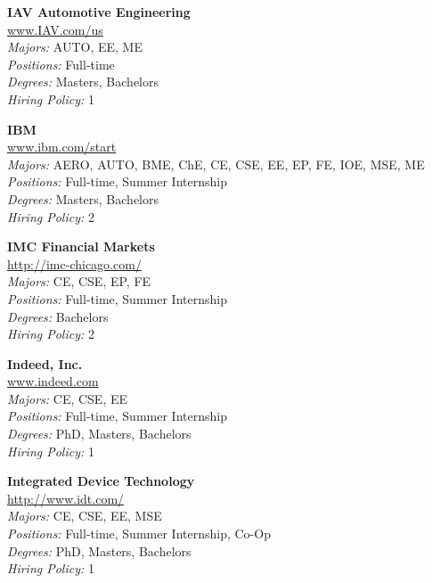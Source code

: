 \documentclass{article}
\begin{document}
\begin{center}
\begin{multicols}{3}
\begin{minipage}{.9\columnwidth}{\Large\bf IAV Automotive Engineering }\\
	\url{www.IAV.com/us}\\
	\emph{Majors:} AUTO, EE, ME\\
	\emph{Positions:} Full-time\\
	\emph{Degrees:} Masters, Bachelors\\
	\emph{Hiring Policy:} 1\\
\end{minipage}
 
\begin{minipage}{.9\columnwidth}{\Large\bf IBM }\\
	\url{www.ibm.com/start}\\
	\emph{Majors:} AERO, AUTO, BME, ChE, CE, CSE, EE, EP, FE, IOE, MSE, ME\\
	\emph{Positions:} Full-time, Summer Internship\\
	\emph{Degrees:} Masters, Bachelors\\
	\emph{Hiring Policy:} 2\\
\end{minipage}
 
\begin{minipage}{.9\columnwidth}{\Large\bf IMC Financial Markets }\\
	\url{http://imc-chicago.com/}\\
	\emph{Majors:} CE, CSE, EP, FE\\
	\emph{Positions:} Full-time, Summer Internship\\
	\emph{Degrees:} Bachelors\\
	\emph{Hiring Policy:} 2\\
\end{minipage}
 
\begin{minipage}{.9\columnwidth}{\Large\bf Indeed, Inc. }\\
	\url{www.indeed.com}\\
	\emph{Majors:} CE, CSE, EE\\
	\emph{Positions:} Full-time, Summer Internship\\
	\emph{Degrees:} PhD, Masters, Bachelors\\
	\emph{Hiring Policy:} 1\\
\end{minipage}
 
\begin{minipage}{.9\columnwidth}{\Large\bf Integrated Device Technology }\\
	\url{http://www.idt.com/}\\
	\emph{Majors:} CE, CSE, EE, MSE\\
	\emph{Positions:} Full-time, Summer Internship, Co-Op\\
	\emph{Degrees:} PhD, Masters, Bachelors\\
	\emph{Hiring Policy:} 1\\
\end{minipage}
 

\end{multicols}
\end{center}
\end{document}

